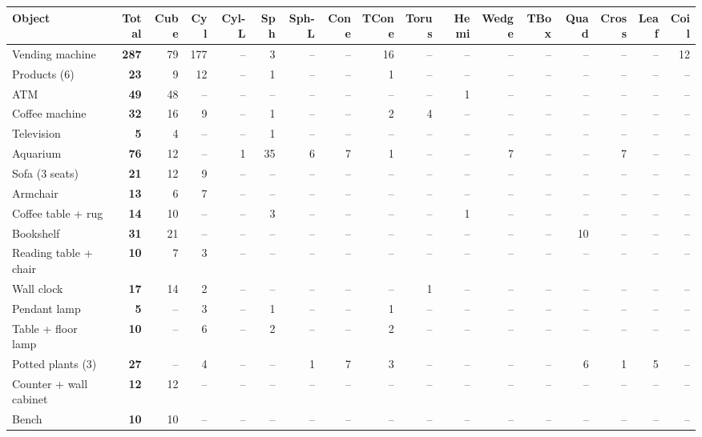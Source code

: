 \begin{tabular}{@{}l r rrrrrrrrrrrrrrr@{}}
\toprule
Object & Total & Cube & Cyl & Cyl-L & Sph & Sph-L & Cone & TCone & Torus & Hemi & Wedge & TBox & Quad & Cross & Leaf & Coil \\
\midrule
Vending machine & \textbf{287} & 79 & 177 & -- & 3 & -- & -- & 16 & -- & -- & -- & -- & -- & -- & -- & 12 \\
Products (6) & \textbf{23} & 9 & 12 & -- & 1 & -- & -- & 1 & -- & -- & -- & -- & -- & -- & -- & -- \\
ATM & \textbf{49} & 48 & -- & -- & -- & -- & -- & -- & -- & 1 & -- & -- & -- & -- & -- & -- \\
Coffee machine & \textbf{32} & 16 & 9 & -- & 1 & -- & -- & 2 & 4 & -- & -- & -- & -- & -- & -- & -- \\
Television & \textbf{5} & 4 & -- & -- & 1 & -- & -- & -- & -- & -- & -- & -- & -- & -- & -- & -- \\
Aquarium & \textbf{76} & 12 & -- & 1 & 35 & 6 & 7 & 1 & -- & -- & 7 & -- & -- & 7 & -- & -- \\
Sofa (3 seats) & \textbf{21} & 12 & 9 & -- & -- & -- & -- & -- & -- & -- & -- & -- & -- & -- & -- & -- \\
Armchair & \textbf{13} & 6 & 7 & -- & -- & -- & -- & -- & -- & -- & -- & -- & -- & -- & -- & -- \\
Coffee table + rug & \textbf{14} & 10 & -- & -- & 3 & -- & -- & -- & -- & 1 & -- & -- & -- & -- & -- & -- \\
Bookshelf & \textbf{31} & 21 & -- & -- & -- & -- & -- & -- & -- & -- & -- & -- & 10 & -- & -- & -- \\
Reading table + chair & \textbf{10} & 7 & 3 & -- & -- & -- & -- & -- & -- & -- & -- & -- & -- & -- & -- & -- \\
Wall clock & \textbf{17} & 14 & 2 & -- & -- & -- & -- & -- & 1 & -- & -- & -- & -- & -- & -- & -- \\
Pendant lamp & \textbf{5} & -- & 3 & -- & 1 & -- & -- & 1 & -- & -- & -- & -- & -- & -- & -- & -- \\
Table + floor lamp & \textbf{10} & -- & 6 & -- & 2 & -- & -- & 2 & -- & -- & -- & -- & -- & -- & -- & -- \\
Potted plants (3) & \textbf{27} & -- & 4 & -- & -- & 1 & 7 & 3 & -- & -- & -- & -- & 6 & 1 & 5 & -- \\
Counter + wall cabinet & \textbf{12} & 12 & -- & -- & -- & -- & -- & -- & -- & -- & -- & -- & -- & -- & -- & -- \\
Bench & \textbf{10} & 10 & -- & -- & -- & -- & -- & -- & -- & -- & -- & -- & -- & -- & -- & -- \\

\end{tabular}
